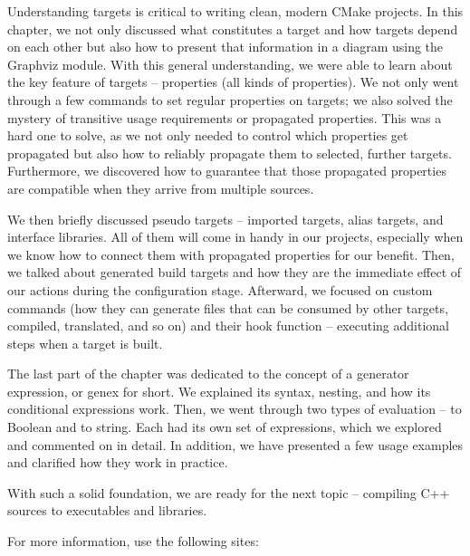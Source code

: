 
Understanding targets is critical to writing clean, modern CMake projects. In this chapter, we not only discussed what constitutes a target and how targets depend on each other but also how to present that information in a diagram using the Graphviz module.
With this general understanding, we were able to learn about the key feature of targets – properties (all kinds of properties). We not only went through a few commands to set regular properties on targets; we also solved the mystery of transitive usage requirements or propagated properties. This was a hard one to solve, as we not only needed to control which properties get propagated but also how to reliably propagate them to selected, further targets. Furthermore, we discovered how to guarantee that those propagated properties are compatible when they arrive from multiple sources.

We then briefly discussed pseudo targets – imported targets, alias targets, and interface libraries. All of them will come in handy in our projects, especially when we know how to connect them with propagated properties for our benefit. Then, we talked about generated build targets and how they are the immediate effect of our actions during the configuration stage. Afterward, we focused on custom commands (how they can generate files that can be consumed by other targets, compiled, translated, and so on) and their hook function – executing additional steps when a target is built.

The last part of the chapter was dedicated to the concept of a generator expression, or genex for short. We explained its syntax, nesting, and how its conditional expressions work. Then, we went through two types of evaluation – to Boolean and to string. Each had its own set of expressions, which we explored and commented on in detail. In addition, we have presented a few usage examples and clarified how they work in practice.

With such a solid foundation, we are ready for the next topic – compiling C++ sources to executables and libraries.


For more information, use the following sites:

